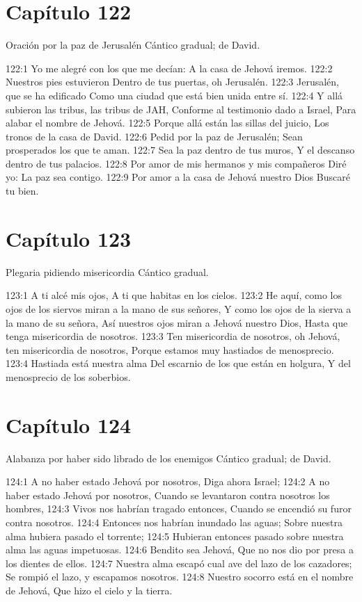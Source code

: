 \section*{Capítulo 122}
Oración por la paz de Jerusalén 
Cántico gradual; de David. 
 
122:1 Yo me alegré con los que me decían: 
A la casa de Jehová iremos. 
122:2 Nuestros pies estuvieron 
Dentro de tus puertas, oh Jerusalén. 
122:3 Jerusalén, que se ha edificado 
Como una ciudad que está bien unida entre sí. 
122:4 Y allá subieron las tribus, las tribus de JAH, 
Conforme al testimonio dado a Israel, 
Para alabar el nombre de Jehová. 
122:5 Porque allá están las sillas del juicio, 
Los tronos de la casa de David. 
122:6 Pedid por la paz de Jerusalén; 
Sean prosperados los que te aman. 
122:7 Sea la paz dentro de tus muros, 
Y el descanso dentro de tus palacios. 
122:8 Por amor de mis hermanos y mis compañeros 
Diré yo: La paz sea contigo. 
122:9 Por amor a la casa de Jehová nuestro Dios 
Buscaré tu bien. 
\section*{Capítulo 123}
Plegaria pidiendo misericordia 
Cántico gradual. 
 
123:1 A ti alcé mis ojos, 
A ti que habitas en los cielos. 
123:2 He aquí, como los ojos de los siervos miran a la mano de sus señores, 
Y como los ojos de la sierva a la mano de su señora, 
Así nuestros ojos miran a Jehová nuestro Dios, 
Hasta que tenga misericordia de nosotros. 
123:3 Ten misericordia de nosotros, oh Jehová, ten misericordia de nosotros, 
Porque estamos muy hastiados de menosprecio. 
123:4 Hastiada está nuestra alma 
Del escarnio de los que están en holgura, 
Y del menosprecio de los soberbios. 
\section*{Capítulo 124}
Alabanza por haber sido librado de los enemigos 
Cántico gradual; de David. 
 
124:1 A no haber estado Jehová por nosotros, 
Diga ahora Israel; 
124:2 A no haber estado Jehová por nosotros, 
Cuando se levantaron contra nosotros los hombres, 
124:3 Vivos nos habrían tragado entonces, 
Cuando se encendió su furor contra nosotros. 
124:4 Entonces nos habrían inundado las aguas; 
Sobre nuestra alma hubiera pasado el torrente; 
124:5 Hubieran entonces pasado sobre nuestra alma las aguas impetuosas. 
124:6 Bendito sea Jehová, 
Que no nos dio por presa a los dientes de ellos. 
124:7 Nuestra alma escapó cual ave del lazo de los cazadores; 
Se rompió el lazo, y escapamos nosotros. 
124:8 Nuestro socorro está en el nombre de Jehová, 
Que hizo el cielo y la tierra. 



